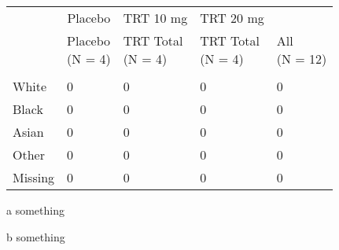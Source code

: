 \documentclass[
]{article}
\begin{document}
\begin{threeparttable}
\begin{tabular}[t]{lllll}
\toprule
\multicolumn{1}{c}{ } & \multicolumn{1}{c}{Placebo} & \multicolumn{1}{c}{TRT 10 mg} & \multicolumn{1}{c}{TRT 20 mg} & \multicolumn{1}{c}{ } \\
\cmidrule(l{3pt}r{3pt}){2-2} \cmidrule(l{3pt}r{3pt}){3-3} \cmidrule(l{3pt}r{3pt}){4-4}
  & \makecell[c]{Placebo\\(N = 4)} & \makecell[c]{TRT Total\\(N = 4)} & \makecell[c]{TRT Total\\(N = 4)} & \makecell[c]{All\\(N = 12)}\\
\midrule
\addlinespace[0.3em]
\multicolumn{5}{l}{\textbf{Race}}\\
\hspace{1em}White & 0 & 0 & 0 & 0\\
\hspace{1em}Black & 0 & 0 & 0 & 0\\
\hspace{1em}Asian & 0 & 0 & 0 & 0\\
\hspace{1em}Other & 0 & 0 & 0 & 0\\
\hspace{1em}Missing & 0 & 0 & 0 & 0\\
\bottomrule
\end{tabular}
\begin{tablenotes}
\small
\item \textit{ } 
\item a something
\item b something
\end{tablenotes}
\end{threeparttable}
\end{document}
